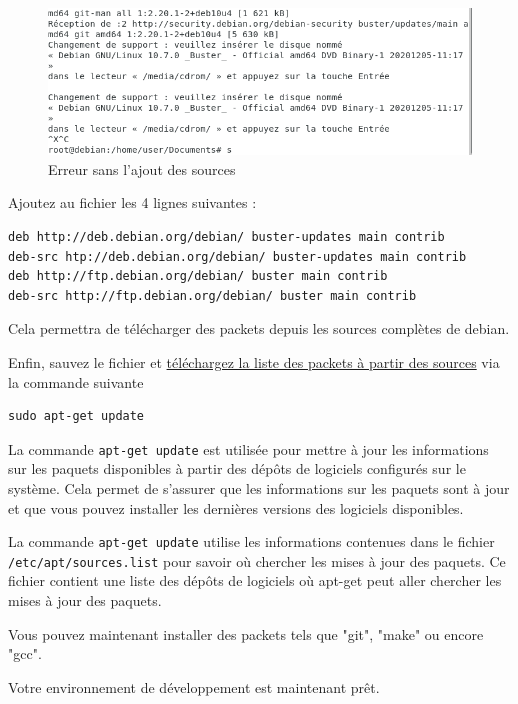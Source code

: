 \documentclass[12pt,a4paper]{article}
\newcommand{\code}[1]{\colorbox{light-gray}{\texttt{#1}}}
\begin{document}
\begin{flushleft}
        \begin{figure}[!h]
         \centering
            \includegraphics[scale=0.6]{cdrom}
            \caption{Erreur sans l'ajout des sources}
        \end{figure}
       \item Ajoutez au fichier les 4 lignes suivantes : 
       \begin{lstlisting}
deb http://deb.debian.org/debian/ buster-updates main contrib
deb-src htp://deb.debian.org/debian/ buster-updates main contrib
deb http://ftp.debian.org/debian/ buster main contrib
deb-src http://ftp.debian.org/debian/ buster main contrib
       \end{lstlisting}
    \item Cela permettra de télécharger des packets depuis les sources complètes de debian. 
    \item Enfin, sauvez le fichier et \underline{téléchargez la liste des packets à partir des sources} via la commande suivante
    \begin{lstlisting}
sudo apt-get update
    \end{lstlisting}
    \item La commande \code{apt-get update} est utilisée pour mettre à jour les informations sur les paquets disponibles à partir des dépôts de logiciels configurés sur le système. Cela permet de s'assurer que les informations sur les paquets sont à jour et que vous pouvez installer les dernières versions des logiciels disponibles.
    \item La commande \code{apt-get update} utilise les informations contenues dans le fichier \code{/etc/apt/sources.list} pour savoir où chercher les mises à jour des paquets. Ce fichier contient une liste des dépôts de logiciels où apt-get peut aller chercher les mises à jour des paquets. 
    \item Vous pouvez maintenant installer des packets tels que "git", "make" ou encore "gcc".
    \item Votre environnement de développement est maintenant prêt.
   \end{flushleft}
\end{document}
